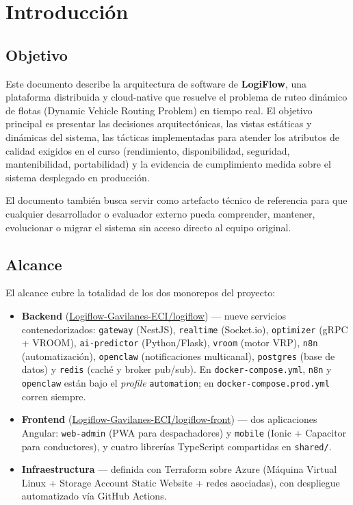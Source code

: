 \documentclass[12pt,a4paper,oneside]{article}
\newcommand{\repobackend}{\href{https://github.com/Logiflow-Gavilanes-ECI/logiflow}{Logiflow-Gavilanes-ECI/logiflow}}
\newcommand{\repofrontend}{\href{https://github.com/Logiflow-Gavilanes-ECI/logiflow-front}{Logiflow-Gavilanes-ECI/logiflow-front}}
\begin{document}

\section{Introducci\'on}

\subsection{Objetivo}
Este documento describe la arquitectura de software de \textbf{LogiFlow}, una plataforma distribuida y cloud-native que resuelve el problema de ruteo din\'amico de flotas (Dynamic Vehicle Routing Problem) en tiempo real. El objetivo principal es presentar las decisiones arquitect\'onicas, las vistas est\'aticas y din\'amicas del sistema, las t\'acticas implementadas para atender los atributos de calidad exigidos en el curso (rendimiento, disponibilidad, seguridad, mantenibilidad, portabilidad) y la evidencia de cumplimiento medida sobre el sistema desplegado en producci\'on.

El documento tambi\'en busca servir como artefacto t\'ecnico de referencia para que cualquier desarrollador o evaluador externo pueda comprender, mantener, evolucionar o migrar el sistema sin acceso directo al equipo original.

\subsection{Alcance}
El alcance cubre la totalidad de los dos monorepos del proyecto:

\begin{itemize}[leftmargin=*]
  \item \textbf{Backend} (\repobackend) --- nueve servicios contenedorizados: \texttt{gateway} (NestJS), \texttt{realtime} (Socket.io), \texttt{optimizer} (gRPC + VROOM), \texttt{ai-predictor} (Python/Flask), \texttt{vroom} (motor VRP), \texttt{n8n} (automatizaci\'on), \texttt{openclaw} (notificaciones multicanal), \texttt{postgres} (base de datos) y \texttt{redis} (cach\'e y broker pub/sub). En \texttt{docker-compose.yml}, \texttt{n8n} y \texttt{openclaw} est\'an bajo el \emph{profile} \texttt{automation}; en \texttt{docker-compose.prod.yml} corren siempre.
  \item \textbf{Frontend} (\repofrontend) --- dos aplicaciones Angular: \texttt{web-admin} (PWA para despachadores) y \texttt{mobile} (Ionic + Capacitor para conductores), y cuatro librer\'ias TypeScript compartidas en \texttt{shared/}.
  \item \textbf{Infraestructura} --- definida con Terraform sobre Azure (M\'aquina Virtual Linux + Storage Account Static Website + redes asociadas), con despliegue automatizado v\'ia GitHub Actions.
\end{itemize}
\end{document}

